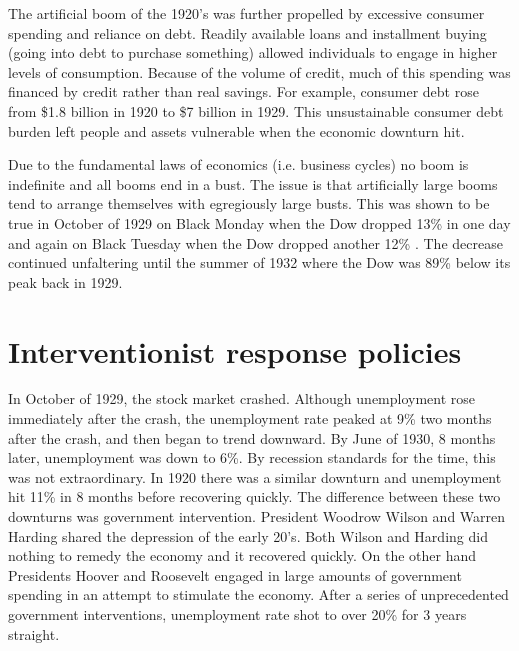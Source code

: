 \documentclass[12pt]{article}
\begin{document}
The artificial boom of the 1920's was further propelled by excessive consumer
spending and reliance on debt. Readily available loans and installment buying
(going into debt to purchase something) allowed individuals to engage in higher
levels of consumption. Because of the volume of credit, much of this spending
was financed by credit rather than real savings. For example, consumer debt
rose from \$1.8 billion in 1920 to \$7 billion in
1929\autocite{americaneconomy20s}. This unsustainable consumer debt burden left
people and assets vulnerable when the economic downturn hit.

Due to the fundamental laws of economics (i.e. business cycles) no boom is
indefinite and all booms end in a bust. The issue is that artificially large
booms tend to arrange themselves with egregiously large busts. This was shown
to be true in October of 1929 on Black Monday when the Dow dropped 13\% in one
day and again on Black Tuesday when the Dow dropped another 12\%
\autocite{stockmarketcrash}. The decrease continued unfaltering until the
summer of 1932 where the Dow was 89\% below its peak back in 1929.

\section{Interventionist response policies}

In October of 1929, the stock market crashed. Although unemployment rose
immediately after the crash, the unemployment rate peaked at 9\% two months
after the crash, and then began to trend downward. By June of 1930, 8 months
later, unemployment was down to 6\%\autocite{nber}. By recession standards for
the time, this was not extraordinary. In 1920 there was a similar downturn and
unemployment hit 11\%\autocite{nber} in 8 months before recovering quickly. The
difference between these two downturns was government intervention. President
Woodrow Wilson and Warren Harding shared the depression of the early 20's. Both
Wilson and Harding did nothing to remedy the economy and it recovered quickly.
On the other hand Presidents Hoover and Roosevelt engaged in large amounts of
government spending in an attempt to stimulate the economy. After a series of
unprecedented government interventions, unemployment rate shot to over
20\%\autocite{nber} for 3 years straight.
\end{document}
